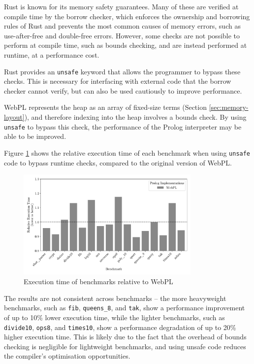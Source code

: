 Rust is known for its memory safety guarantees. Many of these are verified at compile time by the borrow checker, which enforces the ownership and borrowing rules of Rust and prevents the most common causes of memory errors, such as use-after-free and double-free errors. However, some checks are not possible to perform at compile time, such as bounds checking, and are instead performed at runtime, at a performance cost.

Rust provides an \texttt{unsafe} keyword that allows the programmer to bypass these checks. This is necessary for interfacing with external code that the borrow checker cannot verify, but can also be used cautiously to improve performance.

WebPL represents the heap as an array of fixed-size terms (Section \ref{sec:memory-layout}), and therefore indexing into the heap involves a bounds check. By using \texttt{unsafe} to bypass this check, the performance of the Prolog interpreter may be able to be improved.

Figure \ref{fig:unsafe} shows the relative execution time of each benchmark when using \texttt{unsafe} code to bypass runtime checks, compared to the original version of WebPL.

\begin{figure}[H]
\centering
\includegraphics[width=0.8\textwidth]{relative_performance_unsafe.pdf}
\caption{Execution time of benchmarks relative to WebPL}
\label{fig:unsafe}
\end{figure}

The results are not consistent across benchmarks -- the more heavyweight benchmarks, such as \texttt{fib}, \texttt{queens\_8}, and \texttt{tak}, show a performance improvement of up to 10\% lower execution time, while the lighter benchmarks, such as \texttt{divide10}, \texttt{ops8}, and \texttt{times10}, show a performance degradation of up to 20\% higher execution time. This is likely due to the fact that the overhead of bounds checking is negligible for lightweight benchmarks, and using unsafe code reduces the compiler's optimisation opportunities.

